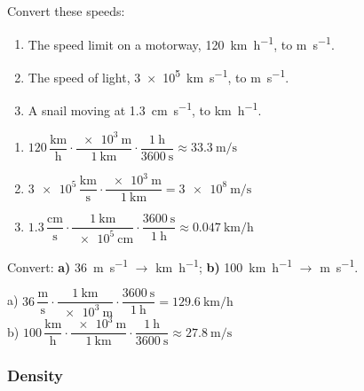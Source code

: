 \begin{exercise}
    Convert these speeds:
    \begin{enumerate}[label=\letraminuscula]
        \item The speed limit on a motorway, \qty{120}{\km\per\hour}, to \unit{\m\per\s}.
        \item The speed of light, \qty{3e5}{\km\per\s}, to \unit{\m\per\s}.
        \item A snail moving at \qty{1.3}{\cm\per\s}, to \unit{\km\per\hour}.
    \end{enumerate}
    \begin{solu}
        \begin{enumerate}[label=\alph*)]
            \item \(\num{120}\,\dfrac{\unit{\km}}{\unit{\hour}} \cdot \dfrac{\qty{e3}{\m}}{\qty{1}{\km}} \cdot \dfrac{\qty{1}{\hour}}{\qty{3600}{\s}} \approx \qty{33.3}{\m\per\s}\)
            \item \(\num{3e5}\,\dfrac{\unit{\km}}{\unit{\s}} \cdot \dfrac{\qty{e3}{\m}}{\qty{1}{\km}} = \qty{3e8}{\m\per\s}\)
            \item \(\num{1.3}\,\dfrac{\unit{\cm}}{\unit{\s}} \cdot \dfrac{\qty{1}{\km}}{\qty{e5}{\cm}} \cdot \dfrac{\qty{3600}{\s}}{\qty{1}{\hour}} \approx \qty{0.047}{\km\per\hour}\)
        \end{enumerate}
    \end{solu}
\end{exercise}

\begin{exercise}
    Convert: \textbf{a)} \qty{36}{\m\per\s} \(\to\) \unit{\km\per\hour}; \textbf{b)} \qty{100}{\km\per\hour} \(\to\) \unit{\m\per\s}.
    \begin{solu}
        a) \(\num{36}\,\dfrac{\unit{\m}}{\unit{\s}} \cdot \dfrac{\qty{1}{\km}}{\qty{e3}{\m}} \cdot \dfrac{\qty{3600}{\s}}{\qty{1}{\hour}} = \qty{129.6}{\km\per\hour}\) \\
        b) \(\num{100}\,\dfrac{\unit{\km}}{\unit{\hour}} \cdot \dfrac{\qty{e3}{\m}}{\qty{1}{\km}} \cdot \dfrac{\qty{1}{\hour}}{\qty{3600}{\s}} \approx \qty{27.8}{\m\per\s}\)
    \end{solu}
\end{exercise}


\subsubsection{Density}

